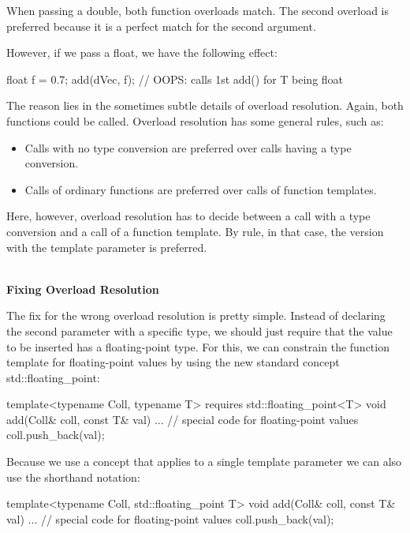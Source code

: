 When passing a double, both function overloads match. The second overload is preferred because it is a perfect match for the second argument.

However, if we pass a float, we have the following effect:

\begin{cpp}
float f = 0.7;
add(dVec, f); // OOPS: calls 1st add() for T being float
\end{cpp}

The reason lies in the sometimes subtle details of overload resolution. Again, both functions could be called. Overload resolution has some general rules, such as:

\begin{itemize}
\item
Calls with no type conversion are preferred over calls having a type conversion.

\item
Calls of ordinary functions are preferred over calls of function templates.
\end{itemize}

Here, however, overload resolution has to decide between a call with a type conversion and a call of a function template. By rule, in that case, the version with the template parameter is preferred.

\noindent
\hspace*{\fill} \\ %
\textbf{Fixing Overload Resolution}

The fix for the wrong overload resolution is pretty simple. Instead of declaring the second parameter with a specific type, we should just require that the value to be inserted has a floating-point type. For this, we can constrain the function template for floating-point values by using the new standard concept std::floating\_point:

\begin{cpp}
template<typename Coll, typename T>
requires std::floating_point<T>
void add(Coll& coll, const T& val)
{
	... // special code for floating-point values
	coll.push_back(val);
}
\end{cpp}

Because we use a concept that applies to a single template parameter we can also use the shorthand notation:

\begin{cpp}
template<typename Coll, std::floating_point T>
void add(Coll& coll, const T& val)
{
	... // special code for floating-point values
	coll.push_back(val);
}
\end{cpp}

